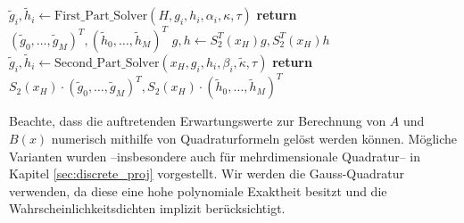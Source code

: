 \begin{algorithm}[ht]
\begin{algorithmic}[1]
        		\State $\tilde{g}_i,\tilde{h}_i\gets \text{First\_Part\_Solver}(H,g_i, h_i,\alpha_i,\kappa,\tau)$
        	\EndFor
        	\State \textbf{return} $(\tilde{g}_0,\dots,\tilde{g}_M)^T, (\tilde{h}_0,\dots,\tilde{h}_M)^T$
        \EndFunction
        	\State $g,h\gets S_2^T(x_H)g, S_2^T(x_H)h$
        		\State $\tilde{g}_i,\tilde{h}_i\gets \text{Second\_Part\_Solver}(x_H,g_i,h_i,\beta_i,\tilde{\kappa},\tau)$
        	\EndFor
        	\State \textbf{return} $S_2(x_H)\cdot (\tilde{g}_0,\dots,\tilde{g}_M)^T, S_2(x_H)\cdot (\tilde{h}_0,\dots,\tilde{h}_M)^T$
        \EndFunction
        
    \end{algorithmic}
\end{algorithm}
Beachte, dass die auftretenden Erwartungswerte zur Berechnung von $A$ und $B(x)$ numerisch mithilfe von Quadraturformeln gelöst werden können. Mögliche Varianten wurden --insbesondere auch für mehrdimensionale Quadratur-- in Kapitel \ref{sec:discrete_proj} vorgestellt. Wir werden die Gauss-Quadratur verwenden, da diese eine hohe polynomiale Exaktheit besitzt und die Wahrscheinlichkeitsdichten implizit berücksichtigt.
